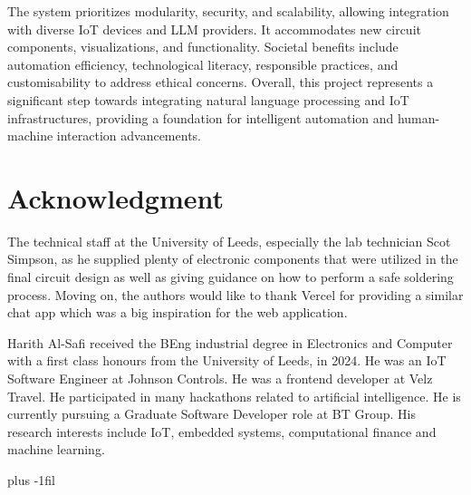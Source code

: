 \documentclass[lettersize,journal]{IEEEtran}
\begin{document}
The system prioritizes modularity, security, and scalability, allowing integration with diverse IoT devices and LLM providers. It accommodates new circuit components, visualizations, and functionality. Societal benefits include automation efficiency, technological literacy, responsible practices, and customisability to address ethical concerns. Overall, this project represents a significant step towards integrating natural language processing and IoT infrastructures, providing a foundation for intelligent automation and human-machine interaction advancements. 

\section*{Acknowledgment}
The technical staff at the University of Leeds, especially the lab technician Scot Simpson, as he supplied plenty of electronic components that were utilized in the final circuit design as well as giving guidance on how to perform a safe soldering process. Moving on, the authors would like to thank Vercel for providing a similar chat app which was a big inspiration for the web application.




\begin{IEEEbiography}{Harith Al-Safi} received the BEng industrial degree in Electronics and Computer with a first class honours from the University of Leeds, in 2024. He was an IoT Software Engineer at Johnson Controls. He was a frontend developer at Velz Travel.  He participated in many hackathons related to artificial intelligence. He is currently pursuing a Graduate Software Developer role at BT Group. His research interests include IoT, embedded systems, computational finance and machine learning.
\end{IEEEbiography}

\baselineskip plus -1fil
\end{document}
